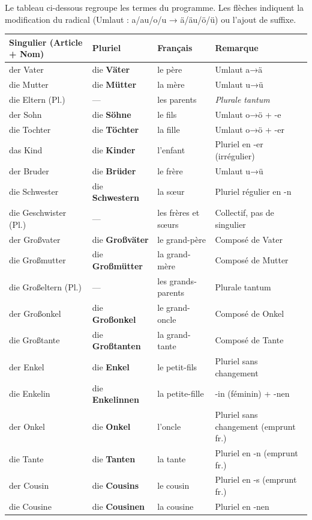 \documentclass[11pt]{article}
\begin{document}
\begin{propriete}
Le tableau ci-dessous regroupe les termes du programme. Les flèches indiquent la modification du radical (Umlaut : a/au/o/u → ä/äu/ö/ü) ou l'ajout de suffixe.
\begin{center}
\begin{tabularx}{\linewidth}{|X|X|X|X|}
\hline
\rowcolor{popblueL} \textbf{Singulier (Article + Nom)} & \textbf{Pluriel} & \textbf{Français} & \textbf{Remarque} \\
\hline
der Vater & die \textbf{Väter} & le père & Umlaut a→ä \\
die Mutter & die \textbf{Mütter} & la mère & Umlaut u→ü \\
die Eltern (Pl.) & — & les parents & \emph{Plurale tantum} \\
der Sohn & die \textbf{Söhne} & le fils & Umlaut o→ö + -e \\
die Tochter & die \textbf{Töchter} & la fille & Umlaut o→ö + -er \\
das Kind & die \textbf{Kinder} & l'enfant & Pluriel en -er (irrégulier) \\
der Bruder & die \textbf{Brüder} & le frère & Umlaut u→ü \\
die Schwester & die \textbf{Schwestern} & la sœur & Pluriel régulier en -n \\
die Geschwister (Pl.) & — & les frères et sœurs & Collectif, pas de singulier \\
der Großvater & die \textbf{Großväter} & le grand-père & Composé de Vater \\
die Großmutter & die \textbf{Großmütter} & la grand-mère & Composé de Mutter \\
die Großeltern (Pl.) & — & les grands-parents & Plurale tantum \\
der Großonkel & die \textbf{Großonkel} & le grand-oncle & Composé de Onkel \\
die Großtante & die \textbf{Großtanten} & la grand-tante & Composé de Tante \\
der Enkel & die \textbf{Enkel} & le petit-fils & Pluriel sans changement \\
die Enkelin & die \textbf{Enkelinnen} & la petite-fille & -in (féminin) + -nen \\
der Onkel & die \textbf{Onkel} & l'oncle & Pluriel sans changement (emprunt fr.) \\
die Tante & die \textbf{Tanten} & la tante & Pluriel en -n (emprunt fr.) \\
der Cousin & die \textbf{Cousins} & le cousin & Pluriel en -s (emprunt fr.) \\
die Cousine & die \textbf{Cousinen} & la cousine & Pluriel en -nen \\
\hline
\end{tabularx}
\end{center}
\end{propriete}
\end{document}
